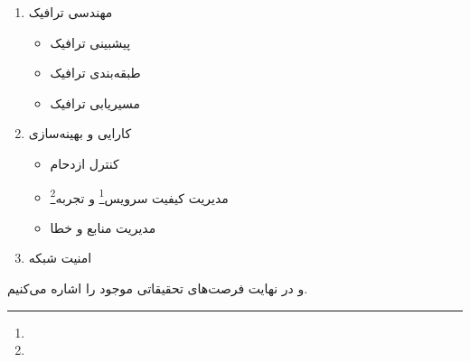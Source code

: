 \begin{enumerate}
    \item مهندسی ترافیک
    \begin{itemize}
        \item پیشبینی ترافیک
        \item طبقه‌بندی ترافیک
        \item مسیریابی ترافیک
    \end{itemize}
    
    
    \item کارایی و بهینه‌سازی
    \begin{itemize}
        \item کنترل ازدحام
        \item مدیریت کیفیت سرویس\footnote{} و تجربه\footnote{}
        \item مدیریت منابع و خطا
    \end{itemize}
    \item امنیت شبکه
    
\end{enumerate}


و در نهایت فرصت‌های تحقیقاتی موجود را اشاره می‌کنیم.
